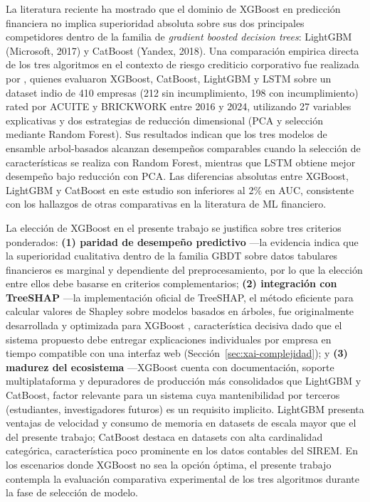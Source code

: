 \documentclass[12pt, letterpaper]{article}
\begin{document}
La literatura reciente ha mostrado que el dominio de XGBoost en predicci\'on financiera \citep{Dasilas2024} no implica superioridad absoluta sobre sus dos principales competidores dentro de la familia de \textit{gradient boosted decision trees}: LightGBM (Microsoft, 2017) y CatBoost (Yandex, 2018). Una comparaci\'on empirica directa de los tres algoritmos en el contexto de riesgo crediticio corporativo fue realizada por \citet{Sujatha2025}, quienes evaluaron XGBoost, CatBoost, LightGBM y LSTM sobre un dataset indio de 410 empresas (212 sin incumplimiento, 198 con incumplimiento) rated por ACUITE y BRICKWORK entre 2016 y 2024, utilizando 27 variables explicativas y dos estrategias de reducci\'on dimensional (PCA y selecci\'on mediante Random Forest). Sus resultados indican que los tres modelos de ensamble arbol-basados alcanzan desempe\~nos comparables cuando la selecci\'on de caracter\'isticas se realiza con Random Forest, mientras que LSTM obtiene mejor desempe\~no bajo reducci\'on con PCA. Las diferencias absolutas entre XGBoost, LightGBM y CatBoost en este estudio son inferiores al 2\% en AUC, consistente con los hallazgos de otras comparativas en la literatura de ML financiero.

La elecci\'on de XGBoost en el presente trabajo se justifica sobre tres criterios ponderados: \textbf{(1) paridad de desempe\~no predictivo} ---la evidencia \citep{Sujatha2025, Dasilas2024} indica que la superioridad cualitativa dentro de la familia GBDT sobre datos tabulares financieros es marginal y dependiente del preprocesamiento, por lo que la elecci\'on entre ellos debe basarse en criterios complementarios; \textbf{(2) integraci\'on con TreeSHAP} ---la implementaci\'on oficial de TreeSHAP, el m\'etodo eficiente para calcular valores de Shapley sobre modelos basados en \'arboles, fue originalmente desarrollada y optimizada para XGBoost \citep{LundbergTreeSHAP2020}, caracter\'istica decisiva dado que el sistema propuesto debe entregar explicaciones individuales por empresa en tiempo compatible con una interfaz web (Secci\'on~\ref{sec:xai-complejidad}); y \textbf{(3) madurez del ecosistema} ---XGBoost cuenta con documentaci\'on, soporte multiplataforma y depuradores de producci\'on m\'as consolidados que LightGBM y CatBoost, factor relevante para un sistema cuya mantenibilidad por terceros (estudiantes, investigadores futuros) es un requisito implicito. LightGBM presenta ventajas de velocidad y consumo de memoria en datasets de escala mayor que el del presente trabajo; CatBoost destaca en datasets con alta cardinalidad categ\'orica, caracter\'istica poco prominente en los datos contables del SIREM. En los escenarios donde XGBoost no sea la opci\'on \'optima, el presente trabajo contempla la evaluaci\'on comparativa experimental de los tres algoritmos durante la fase de selecci\'on de modelo.
\end{document}
